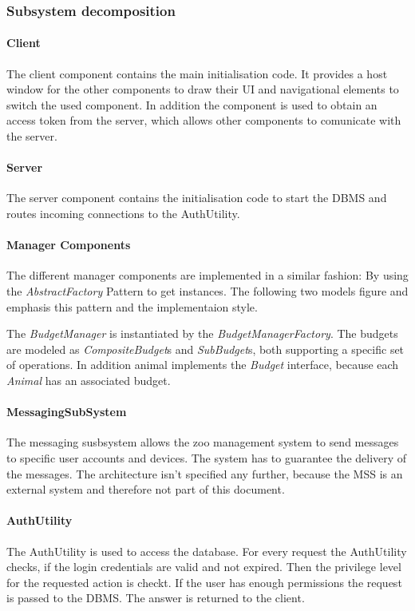 		\subsubsection{Subsystem decomposition}

			\paragraph{Client}
				The client component contains the main initialisation code. It provides a host window for the other components to draw their UI and navigational elements to switch the used component. In addition the component is used to obtain an access token from the server, which allows other components to comunicate with the server.

			\paragraph{Server}
				The server component contains the initialisation code to start the DBMS and routes incoming connections to the AuthUtility.
			\paragraph{Manager Components}
				The different manager components are implemented in a similar fashion: By using the \emph{AbstractFactory} Pattern to get instances. The following two models figure and  emphasis this pattern and the implementaion style.

				The \emph{BudgetManager} is instantiated by the \emph{BudgetManagerFactory}. The budgets are modeled as \emph{CompositeBudget}s and \emph{SubBudget}s, both supporting a specific set of operations. In addition animal implements the \emph{Budget} interface, because each \emph{Animal} has an associated budget.
			
			\paragraph{MessagingSubSystem}
				The messaging susbsystem allows the zoo management system to send messages to specific user accounts and devices. The system has to guarantee the delivery of the messages.	The architecture isn't specified any further, because the MSS is an external system and therefore not part of this document.
			\paragraph{AuthUtility}
				The AuthUtility is used to access the database. For every request the AuthUtility checks, if the login credentials are valid and not expired. Then the privilege level for the requested action is checkt. If the user has enough permissions the request is passed to the DBMS. The answer is returned to the client.
